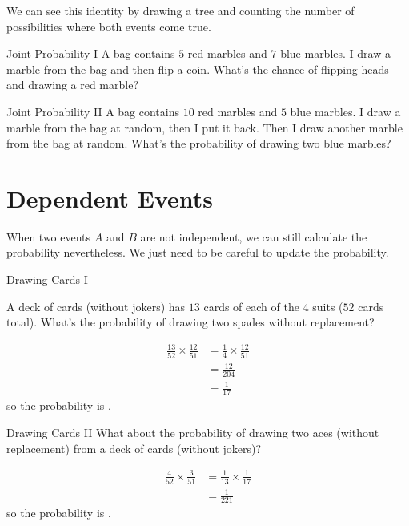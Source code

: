 \documentclass[a4paper,10pt]{report}
\begin{document}
We can see this identity by drawing a tree and counting the number of
possibilities where both events come true.

\begin{problem}{Joint Probability I}
 A bag contains $5$ red marbles and $7$ blue marbles. I draw a marble from the
 bag and then flip a coin. What's the chance of flipping heads and drawing a red
 marble?
\end{problem}

\begin{problem}{Joint Probability II}
 A bag contains $10$ red marbles and $5$ blue marbles. I draw a marble from the
 bag at random, then I put it back. Then I draw another marble from the bag at
 random. What's the probability of drawing two blue marbles?
\end{problem}

\section{Dependent Events}

When two events $A$ and $B$ are not independent, we can still calculate the
probability nevertheless. We just need to be careful to update the probability.

\begin{problem}{Drawing Cards I}

 A deck of cards (without jokers) has $13$ cards of each of the $4$ suits ($52$
 cards total). What's the probability of drawing two spades without replacement?

 \begin{solution}
  \begin{align*}
   \frac{13}{52} \times \frac{12}{51}
   &= \frac{1}{4} \times \frac{12}{51} \\
   &= \frac{12}{204} \\
   &= \frac{1}{17}
  \end{align*}
  so the probability is .
 \end{solution}

\end{problem}

\begin{problem}{Drawing Cards II}
 What about the probability of drawing two aces (without replacement) from a
 deck of cards (without jokers)?

 \begin{solution}
  \begin{align*}
   \frac{4}{52} \times \frac{3}{51}
   &= \frac{1}{13} \times \frac{1}{17} \\
   &= \frac{1}{221}
  \end{align*}
  so the probability is .
 \end{solution}
\end{problem}
\end{document}
